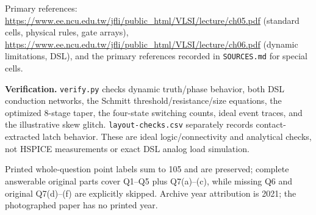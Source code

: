 \documentclass[10pt]{article}
\begin{document}
\begin{flushleft}Primary references: \url{https://www.ee.ncu.edu.tw/jfli/public_html/VLSI/lecture/ch05.pdf} (standard cells, physical rules, gate arrays), \url{https://www.ee.ncu.edu.tw/jfli/public_html/VLSI/lecture/ch06.pdf} (dynamic limitations, DSL), and the primary references recorded in \texttt{SOURCES.md} for special cells.\end{flushleft}

\textbf{Verification.} \texttt{verify.py} checks dynamic truth/phase behavior, both DSL conduction networks, the Schmitt threshold/resistance/size equations, the optimized 8-stage taper, the four-state switching counts, ideal event traces, and the illustrative skew glitch. \texttt{layout-checks.csv} separately records contact-extracted latch behavior. These are ideal logic/connectivity and analytical checks, not HSPICE measurements or exact DSL analog load simulation.

Printed whole-question point labels sum to 105 and are preserved; complete answerable original parts cover Q1--Q5 plus Q7(a)--(c), while missing Q6 and original Q7(d)--(f) are explicitly skipped. Archive year attribution is 2021; the photographed paper has no printed year.
\end{document}
